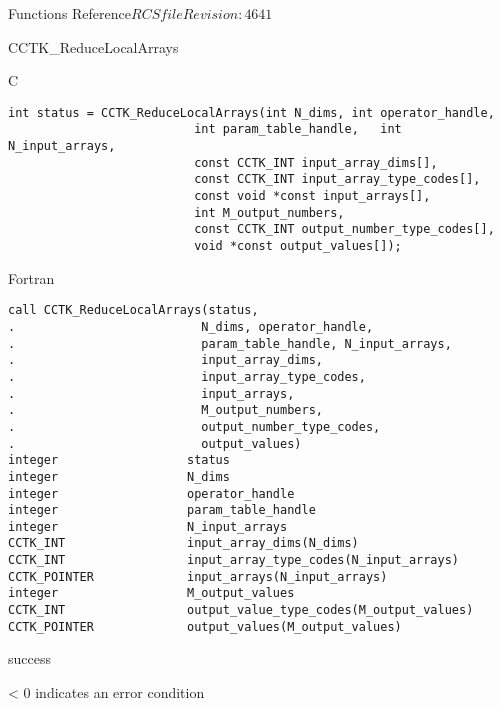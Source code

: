 \begin{cactuspart}{ Functions Reference}{$RCSfile$}{$Revision: 4641 $}
\begin{FunctionDescription}{CCTK\_ReduceLocalArrays}
\begin{SynopsisSection}
\begin{Synopsis}{C}
\begin{verbatim}
int status = CCTK_ReduceLocalArrays(int N_dims, int operator_handle,
                          int param_table_handle,   int N_input_arrays,
                          const CCTK_INT input_array_dims[],
                          const CCTK_INT input_array_type_codes[],
                          const void *const input_arrays[],
                          int M_output_numbers,
                          const CCTK_INT output_number_type_codes[],
                          void *const output_values[]);
\end{verbatim}
\end{Synopsis}
\begin{Synopsis}{Fortran}
\begin{verbatim}
call CCTK_ReduceLocalArrays(status,
.                          N_dims, operator_handle,
.                          param_table_handle, N_input_arrays,
.                          input_array_dims,
.                          input_array_type_codes,
.                          input_arrays,
.                          M_output_numbers,
.                          output_number_type_codes,
.                          output_values)
integer                  status
integer                  N_dims
integer                  operator_handle
integer                  param_table_handle
integer                  N_input_arrays
CCTK_INT                 input_array_dims(N_dims)
CCTK_INT                 input_array_type_codes(N_input_arrays)
CCTK_POINTER             input_arrays(N_input_arrays)
integer                  M_output_values
CCTK_INT                 output_value_type_codes(M_output_values)
CCTK_POINTER             output_values(M_output_values)
\end{verbatim}
\end{Synopsis}
\end{SynopsisSection}

\begin{ResultSection}
\begin{Result}{0} success \end{Result}
\begin{Result}{< 0} indicates an error condition \end{Result}
\end{ResultSection}


\end{FunctionDescription}
\end{cactuspart}
